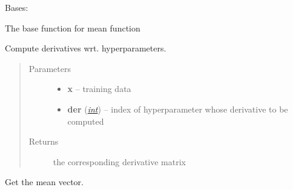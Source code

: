 \documentclass[letterpaper,10pt,english]{sphinxmanual}
\begin{document}
\begin{fulllineitems}
\label{pyGPs.Core:pyGPs.Core.mean.Mean}
Bases: 

The base function for mean function

\begin{fulllineitems}
\label{pyGPs.Core:pyGPs.Core.mean.Mean.getDerMatrix}
Compute derivatives wrt. hyperparameters.
\begin{quote}\begin{description}
\item[{Parameters}] \leavevmode\begin{itemize}
\item {} 
\textbf{x} -- training data

\item {} 
\textbf{der} (\href{http://docs.python.org/library/functions.html\#int}{\emph{int}}) -- index of hyperparameter whose derivative to be computed

\end{itemize}

\item[{Returns}] \leavevmode
the corresponding derivative matrix

\end{description}\end{quote}

\end{fulllineitems}


\begin{fulllineitems}
\label{pyGPs.Core:pyGPs.Core.mean.Mean.getMean}
Get the mean vector.

\end{fulllineitems}


\end{fulllineitems}

\end{document}
